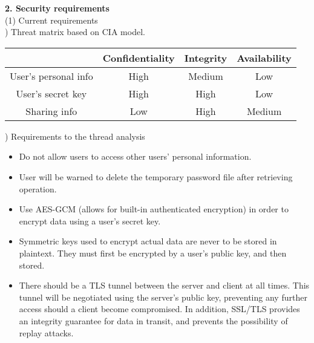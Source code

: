 \documentclass[11pt, letterpaper]{article}
\newcommand{\DesignSection}[1]
{\noindent\textbf{#1}\\}
\begin{document}
\DesignSection{2. Security requirements}
\noindent(1) Current requirements\\
) Threat matrix based on CIA model.

\setlength{\tabcolsep}{5pt}
\indent\begin{tabular}{| c | c | c | c |}
	\hline
	  & Confidentiality & Integrity & Availability \\
	\hline
	User's personal info & High & Medium & Low \\
	\hline
	User's secret key & High & High & Low \\
	\hline
	Sharing info & Low & High & Medium \\
	\hline
\end{tabular}

\smallskip
{}) Requirements to the thread analysis
\begin{itemize} \itemsep1pt \parskip0pt 
\item Do not allow users to access other users’ personal information.
\item User will be warned to delete the temporary password file after retrieving operation.
\item Use AES-GCM (allows for built-in authenticated encryption) in order to encrypt data using a user’s secret key.
\item Symmetric keys used to encrypt actual data are never to be stored in plaintext. They must first be encrypted by a user’s public key, and then stored.
\item There should be a TLS tunnel between the server and client at all times. This tunnel will be negotiated using the server’s public key, preventing any further access should a client become compromised. In addition, SSL/TLS provides an integrity guarantee for data in transit, and prevents the possibility of replay attacks.
\end{itemize}
\end{document}
